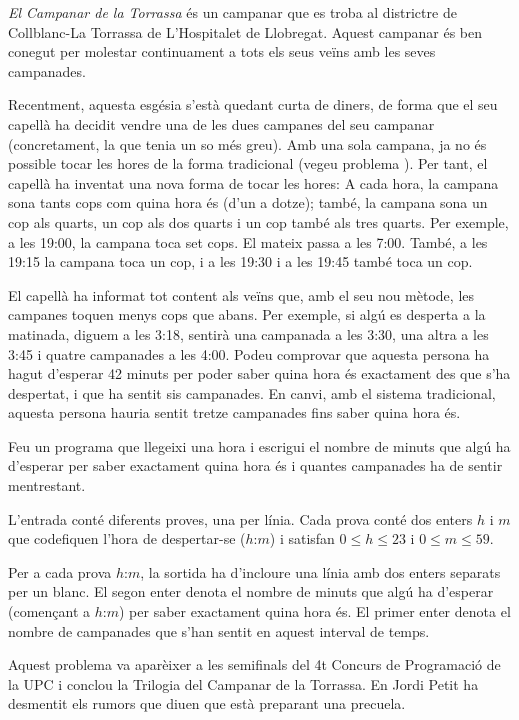 

\Statement


\emph{El Campanar de la Torrassa} és un campanar que es troba al districtre de
Collblanc-La Torrassa de L'Hospitalet de Llobregat. Aquest campanar és ben
conegut per molestar continuament a tots els seus veïns amb les seves
campanades.

\medskip Recentment, aquesta esgésia s'està quedant curta de diners, de forma que
el seu capellà ha decidit vendre una de les dues campanes del seu campanar
(concretament, la que tenia un so més greu). Amb una sola campana, ja no és
possible tocar les hores de la forma tradicional (vegeu problema ).
Per tant, el capellà ha inventat una nova forma de tocar les hores: A cada hora,
la campana sona tants cops com quina hora és (d'un a dotze); també,
la campana sona un cop als quarts, un cop als dos quarts i un cop també
als tres quarts. Per exemple, a les 19:00, la campana toca set cops.
El mateix passa a les 7:00. També, a les 19:15 la campana
toca un cop, i a les 19:30 i a les 19:45 també toca un cop.

\medskip

El capellà ha informat tot content als veïns que, amb el seu nou mètode,
les campanes toquen menys cops que abans. Per exemple, si algú es desperta
a la matinada, diguem a les 3:18, sentirà una campanada a les 3:30,
una altra a les 3:45 i quatre campanades a les 4:00. Podeu comprovar
que aquesta persona ha hagut d'esperar 42 minuts per poder saber quina
hora és exactament des que s'ha despertat, i que ha sentit sis campanades.
En canvi, amb el sistema tradicional, aquesta persona hauria sentit tretze
campanades fins saber quina hora és.

\medskip

Feu un programa que llegeixi una hora i escrigui el nombre de minuts
que algú ha d'esperar per saber exactament quina hora és i quantes
campanades ha de sentir mentrestant.

\Input

L'entrada conté diferents proves, una per línia. Cada prova conté
dos enters $h$ i $m$ que codefiquen l'hora de despertar-se ($h$:$m$) i
satisfan $0\le h\le 23$ i $0\le m\le 59$. 


\Output

Per a cada prova $h$:$m$, la sortida 
ha d'incloure una línia amb dos enters separats per un blanc.
El segon enter denota el nombre de minuts que algú ha d'esperar
(començant a $h$:$m$) per saber exactament quina hora és.
El primer enter denota el nombre de campanades que s'han sentit en
aquest interval de temps.


\Sample

\Observation

Aquest problema va aparèixer a les semifinals del 4t Concurs de Programació de
la UPC i conclou la Trilogia del Campanar de la Torrassa. En Jordi Petit ha
desmentit els rumors que diuen que està preparant una precuela.


